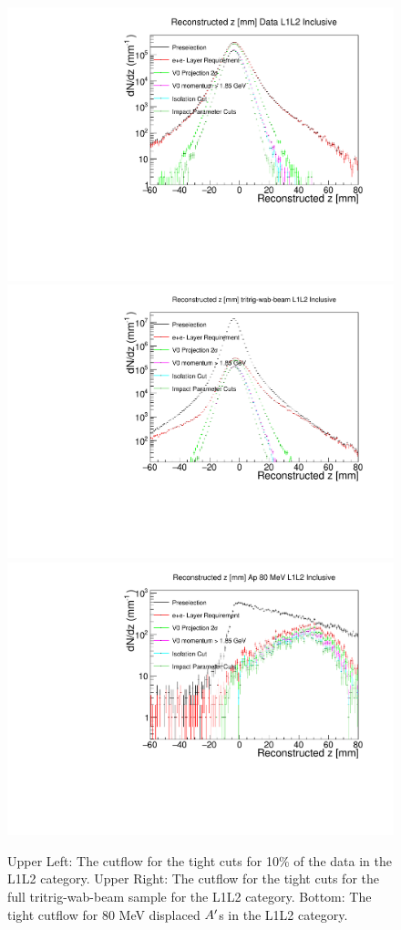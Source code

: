 \begin{figure}[!ht] 
    \centering
    \includegraphics[width=.45\textwidth]{figs/selection/datatightcutflowL1L2_vz.pdf}
    \includegraphics[width=.45\textwidth]{figs/selection/mctightcutflowL1L2_vz.pdf}
    \includegraphics[width=.45\textwidth]{figs/selection/ap_80MeV_tightcutflowL1L2.pdf}
    \caption{
    	Upper Left: The cutflow for the tight cuts for 10\% of the data in the L1L2 category. Upper Right: The cutflow for the tight cuts for the full tritrig-wab-beam sample for the L1L2 category. Bottom: The tight cutflow for 80 MeV displaced $A^\prime$s in the L1L2 category. %
    }
    \label{fig:tightcutflow_L1L2}
\end{figure} 


